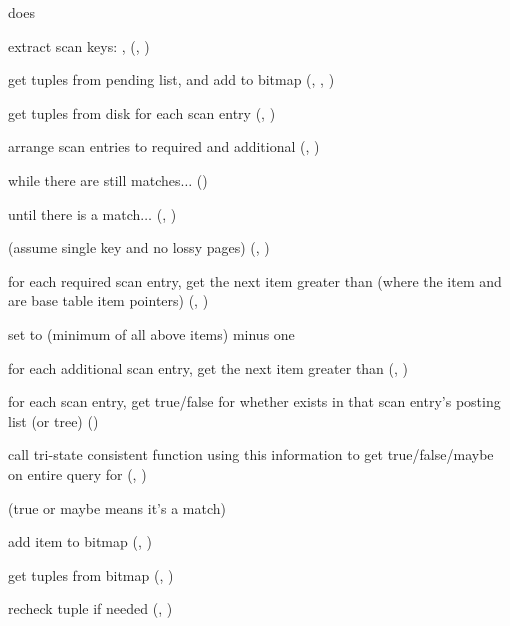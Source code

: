  does

\begin{nparts}
\item
  extract scan keys: , 
  (, )
\item
  get tuples from pending list, and add to bitmap (,
  , )
\item
  get tuples from disk for each scan entry (,
  )
\item
  arrange scan entries to required and additional (,
  )
\item
  while there are still matches$\ldots$ ()
  \begin{iparts}
  \item
    until there is a match$\ldots$ (,
    )
    \begin{qparts}
    \item
      (assume single key and no lossy pages) (,
      )
    \item
      for each required scan entry, get the next item greater than
       (where the item and  are base
      table item pointers) (, )
    \item
      set  to  (minimum of all above
      items) minus one
    \item
      for each additional scan entry, get the next item greater than
       (, )
    \item
      for each scan entry, get true/false for whether  exists
      in that scan entry's posting list (or tree) ()
    \item
      call tri-state consistent function using this information to get
      true/false/maybe on entire query for 
      (, )
    \item
      (true or maybe means it's a match)
    \end{qparts}
  \item
    add item to bitmap (, )
  \end{iparts}
\item
  get tuples from bitmap (,
  )
\item
  recheck tuple if needed (,
  )
\end{nparts}
